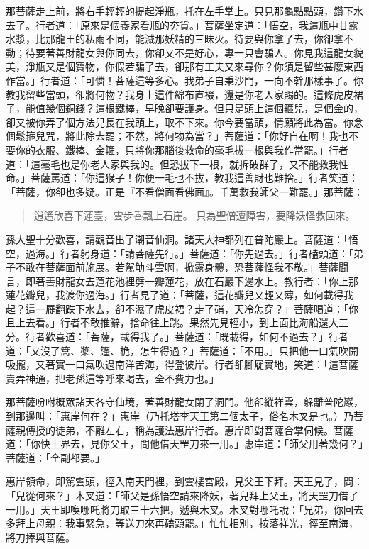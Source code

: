 那菩薩走上前，將右手輕輕的提起淨瓶，托在左手掌上。只見那龜點點頭，鑽下水去了。行者道：「原來是個養家看瓶的夯貨。」菩薩坐定道：「悟空，我這瓶中甘露水漿，比那龍王的私雨不同，能滅那妖精的三昧火。待要與你拿了去，你卻拿不動；待要著善財龍女與你同去，你卻又不是好心，專一只會騙人。你見我這龍女貌美，淨瓶又是個寶物，你假若騙了去，卻那有工夫又來尋你？你須是留些甚麼東西作當。」行者道：「可憐！菩薩這等多心。我弟子自秉沙門，一向不幹那樣事了。你教我留些當頭，卻將何物？我身上這件綿布直裰，還是你老人家賜的。這條虎皮裙子，能值幾個銅錢？這根鐵棒，早晚卻要護身。但只是頭上這個箍兒，是個金的，卻又被你弄了個方法兒長在我頭上，取不下來。你今要當頭，情願將此為當。你念個鬆箍兒咒，將此除去罷；不然，將何物為當？」菩薩道：「你好自在啊！我也不要你的衣服、鐵棒、金箍，只將你那腦後救命的毫毛拔一根與我作當罷。」行者道：「這毫毛也是你老人家與我的。但恐拔下一根，就拆破群了，又不能救我性命。」菩薩罵道：「你這猴子！你便一毛也不拔，教我這善財也難捨。」行者笑道：「菩薩，你卻也多疑。正是『不看僧面看佛面』。千萬救我師父一難罷。」那菩薩：
\begin{quote}
逍遙欣喜下蓮臺，雲步香飄上石崖。
只為聖僧遭障害，要降妖怪救回來。
\end{quote}

孫大聖十分歡喜，請觀音出了潮音仙洞。諸天大神都列在普陀巖上。菩薩道：「悟空，過海。」行者躬身道：「請菩薩先行。」菩薩道：「你先過去。」行者磕頭道：「弟子不敢在菩薩面前施展。若駕觔斗雲啊，掀露身體，恐菩薩怪我不敬。」菩薩聞言，即著善財龍女去蓮花池裡劈一瓣蓮花，放在石巖下邊水上。教行者：「你上那蓮花瓣兒，我渡你過海。」行者見了道：「菩薩，這花瓣兒又輕又薄，如何載得我起？這一屣翻跌下水去，卻不濕了虎皮裙？走了硝，天冷怎穿？」菩薩喝道：「你且上去看。」行者不敢推辭，捨命往上跳。果然先見輕小，到上面比海船還大三分。行者歡喜道：「菩薩，載得我了。」菩薩道：「既載得，如何不過去？」行者道：「又沒了篙、槳、篷、桅，怎生得過？」菩薩道：「不用。」只把他一口氣吹開吸攏，又著實一口氣吹過南洋苦海，得登彼岸。行者卻腳屣實地，笑道：「這菩薩賣弄神通，把老孫這等呼來喝去，全不費力也。」

那菩薩吩咐概眾諸天各守仙境，著善財龍女閉了洞門。他卻縱祥雲，躲離普陀巖，到那邊叫：「惠岸何在？」惠岸（乃托塔李天王第二個太子，俗名木叉是也。）乃菩薩親傳授的徒弟，不離左右，稱為護法惠岸行者。惠岸即對菩薩合掌伺候。菩薩道：「你快上界去，見你父王，問他借天罡刀來一用。」惠岸道：「師父用著幾何？」菩薩道：「全副都要。」

惠岸領命，即駕雲頭，徑入南天門裡，到雲樓宮殿，見父王下拜。天王見了，問：「兒從何來？」木叉道：「師父是孫悟空請來降妖，著兒拜上父王，將天罡刀借了一用。」天王即喚哪吒將刀取三十六把，遞與木叉。木叉對哪吒說：「兄弟，你回去多拜上母親：我事緊急，等送刀來再磕頭罷。」忙忙相別，按落祥光，徑至南海，將刀捧與菩薩。

